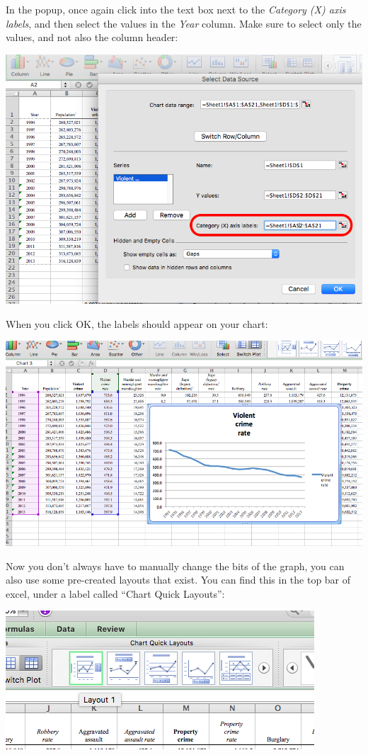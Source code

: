 \documentclass[
]{book}
\begin{document}
In the popup, once again click into the text box next to the \emph{Category (X) axis labels}, and then select the values in the \emph{Year} column. Make sure to select only the values, and not also the column header:

\includegraphics{imgs/desc_viz_4.png}

When you click OK, the labels should appear on your chart:

\includegraphics{imgs/desc_line_3.png}

Now you don't always have to manually change the bits of the graph, you can also use some pre-created layouts that exist. You can find this in the top bar of excel, under a label called ``Chart Quick Layouts'':

\includegraphics{imgs/desc_line_layout.png}
\end{document}
